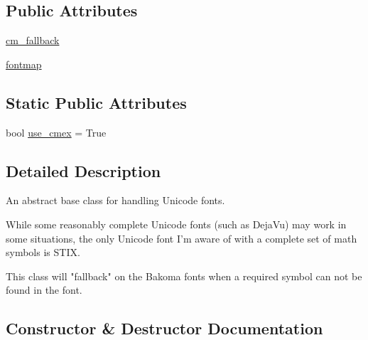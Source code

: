 \subsection*{Public Attributes}
\begin{DoxyCompactItemize}
\item 
\hyperlink{classmatplotlib_1_1__mathtext_1_1UnicodeFonts_a32a0d0e37d37155e1d4012d1377b3279}{cm\+\_\+fallback}
\item 
\hyperlink{classmatplotlib_1_1__mathtext_1_1UnicodeFonts_a8fed14a29e850e5e8c1f67c9ce8270a3}{fontmap}
\end{DoxyCompactItemize}
\subsection*{Static Public Attributes}
\begin{DoxyCompactItemize}
\item 
bool \hyperlink{classmatplotlib_1_1__mathtext_1_1UnicodeFonts_afe8759e387a18481fa6ce7ca3c43a47d}{use\+\_\+cmex} = True
\end{DoxyCompactItemize}


\subsection{Detailed Description}
\begin{DoxyVerb}An abstract base class for handling Unicode fonts.

While some reasonably complete Unicode fonts (such as DejaVu) may
work in some situations, the only Unicode font I'm aware of with a
complete set of math symbols is STIX.

This class will "fallback" on the Bakoma fonts when a required
symbol can not be found in the font.
\end{DoxyVerb}
 

\subsection{Constructor \& Destructor Documentation}
\mbox{\label{classmatplotlib_1_1__mathtext_1_1UnicodeFonts_a2e6524b6d5ec5911363ad95cddda4995}} 
